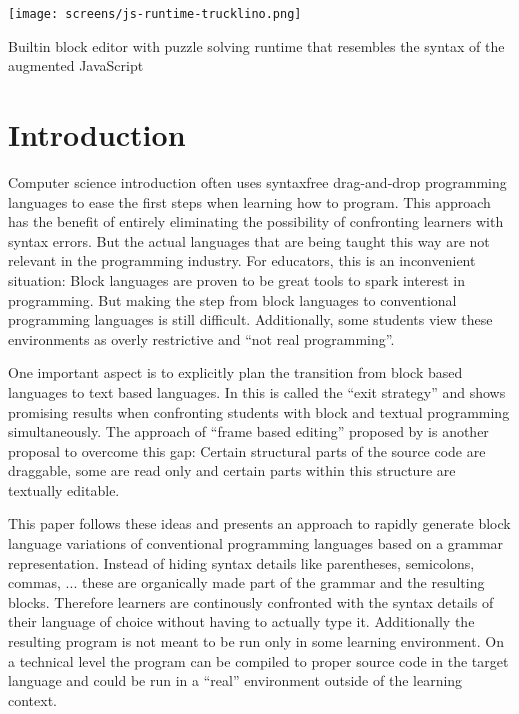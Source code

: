 \documentclass[sigconf,natbib=false]{acmart}
\newcommand{\enquote}[1]{``#1''}
\begin{document}
\begin{teaserfigure}
  \centering\texttt{[image: screens/js-runtime-trucklino.png]}
  \caption{Builtin block editor with puzzle solving runtime that resembles the syntax of the augmented JavaScript}
  \label{fig:js-runtime-trucklino}
\end{teaserfigure}

\maketitle

\section{Introduction}

Computer science introduction often uses syntaxfree drag-and-drop programming languages to ease the first steps when learning how to program. This approach has the benefit of entirely eliminating the possibility of confronting learners with syntax errors. But the actual languages that are being taught this way are not relevant in the programming industry. For educators, this is an inconvenient situation: Block languages are proven to be great tools to spark interest in programming. But making the step from block languages to conventional programming languages is still difficult. Additionally, some students view these environments as overly restrictive and \enquote{not real programming}\cite{braune_learning_2020}.

One important aspect is to explicitly plan the transition from block based languages to text based languages. In \cite{fraser_ten_2015} this is called the \enquote{exit strategy} and \cite{alrubaye_comparison_2019} shows promising results when confronting students with block and textual programming simultaneously. The approach of \enquote{frame based editing} proposed by \cite{kolling_frame-based_2015} is another proposal to overcome this gap: Certain structural parts of the source code are draggable, some are read only and certain parts within this structure are textually editable.

This paper follows these ideas and presents an approach to rapidly generate block language variations of conventional programming languages based on a grammar representation. Instead of hiding syntax details like parentheses, semicolons, commas, ... these are organically made part of the grammar and the resulting blocks. Therefore learners are continously confronted with the syntax details of their language of choice without having to actually type it. Additionally the resulting program is not meant to be run only in some learning environment. On a technical level the program can be compiled to proper source code in the target language and could be run in a \enquote{real} environment outside of the learning context.
\end{document}
